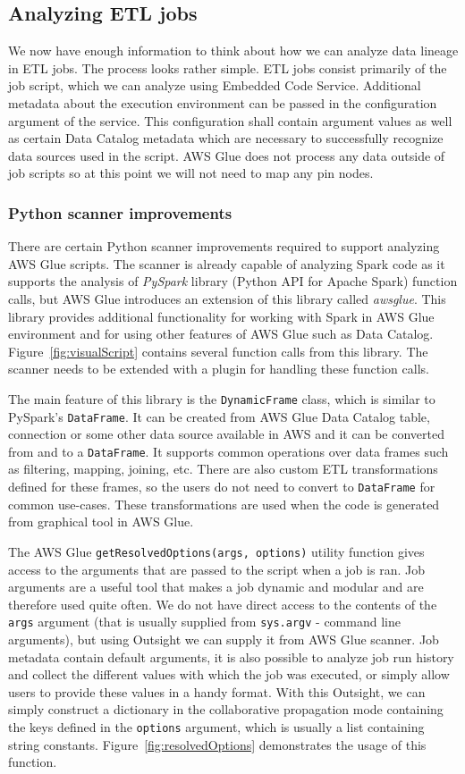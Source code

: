 \subsection{Analyzing ETL jobs}
We now have enough information to think about how we can analyze data lineage in ETL jobs. The process looks rather simple. ETL jobs consist primarily of the job script, which we can analyze using Embedded Code Service. Additional metadata about the execution environment can be passed in the configuration argument of the service. This configuration shall contain argument values as well as certain Data Catalog metadata which are necessary to successfully recognize data sources used in the script. AWS Glue does not process any data outside of job scripts so at this point we will not need to map any pin nodes.

\subsubsection{Python scanner improvements}
\label{sec:python}
There are certain Python scanner improvements required to support analyzing AWS Glue scripts. The scanner is already capable of analyzing Spark code as it supports the analysis of \textit{PySpark} library (Python API for Apache Spark) function calls, but AWS Glue introduces an extension of this library called \textit{awsglue}. This library provides additional functionality for working with Spark in AWS Glue environment and for using other features of AWS Glue such as Data Catalog. Figure~\ref{fig:visualScript} contains several function calls from this library. The scanner needs to be extended with a plugin for handling these function calls.
\par
The main feature of this library is the \texttt{DynamicFrame} class, which is similar to PySpark's \texttt{DataFrame}. It can be created from AWS Glue Data Catalog table, connection or some other data source available in AWS and it can be converted from and to a \texttt{DataFrame}. It supports common operations over data frames such as filtering, mapping, joining, etc. There are also custom ETL transformations defined for these frames, so the users do not need to convert to \texttt{DataFrame} for common use-cases. These transformations are used when the code is generated from graphical tool in AWS Glue.
\par
The AWS Glue \texttt{getResolvedOptions(args, options)} utility function gives access to the arguments that are passed to the script when a job is ran. Job arguments are a useful tool that makes a job dynamic and modular and are therefore used quite often. We do not have direct access to the contents of the \texttt{args} argument (that is usually supplied from \texttt{sys.argv} - command line arguments), but using Outsight we can supply it from AWS Glue scanner. Job metadata contain default arguments, it is also possible to analyze job run history and collect the different values with which the job was executed, or simply allow users to provide these values in a handy format. With this Outsight, we can simply construct a dictionary in the collaborative propagation mode containing the keys defined in the \texttt{options} argument, which is usually a list containing string constants. Figure~\ref{fig:resolvedOptions} demonstrates the usage of this function.
